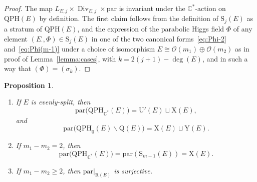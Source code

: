 \documentclass[10pt,a4paper]{amsart}
\newcommand{\field}[1]{\ensuremath{\mathbb{#1}}}
\newcommand{\CC}{\field{C}}
\newcommand{\calO}{\mathcal{O}}
\newcommand{\qp}{\boldsymbol{\cdot}}
\DeclareMathOperator{\Div}{Div}
\numberwithin{equation}{section}
\newtheorem{Proposition}[Theorem]{Proposition}
 { \theoremstyle{definition}
\newtheorem{Definition}[Theorem]{Definition}
\newtheorem{Note}[Theorem]{Note}
\newtheorem{Example}[Theorem]{Example}
\newtheorem{Remark}[Theorem]{Remark} }
\begin{document}
\begin{proof}
The map $L_{E,j}\times\Div_{E,j}\times\mathrm{par}$ is invariant under the $\CC^{*}$-action on $\mathrm{QPH}(E)$ by definition. The first claim follows from the definition of $\mathrm{S}_{j}(E)$ as a stratum of $\mathrm{QPH}(E)$, and the expression of the parabolic Higgs field $\Phi$ of any element $(E_{\qp},\Phi)\in\mathrm{S}_{j}(E)$ in one of the two canonical forms~\eqref{eq:Phi-2} and~\eqref{eq:Phi(m-1)} under a choice of isomorphism $E\cong \calO(m_{1})\oplus\calO(m_{2})$ as in proof of Lemma~\ref{lemma:cases}, with $k=2(j+1) -\deg(E)$, and in such a way that $(\Phi) = (\sigma_{k})$.
\end{proof}


\begin{Proposition}\label{prop:QPH-par}\quad
\begin{enumerate}\itemsep=0pt
\item[$(i)$] If $E$ is evenly-split, then
\[
\mathrm{par}\bigl(\mathrm{QPH}_{\CC^{*}}(E)\bigr) = \mathrm{U}'(E)\sqcup \mathrm{X}(E),
\]
and
\[
\mathrm{par}\bigl(\mathrm{QPH}_{0}(E)\backslash\mathrm{Q}(E)\bigr) = \mathrm{X}(E)\sqcup\mathrm{Y}(E).
\]
\item[$(ii)$] If $m_{1}-m_{2}=2$, then
\[
\mathrm{par}\bigl(\mathrm{QPH}_{\CC^{*}}(E)\bigr) = \mathrm{par}(\mathrm{S}_{m-1}(E)) = \mathrm{X}(E).
\]
\item[$(iii)$] If $m_{1}-m_{2}\geq 2$, then $\mathrm{par}\vert_{\mathrm{R}(E)}$ is surjective.
\end{enumerate}
\end{Proposition}
\end{document}
